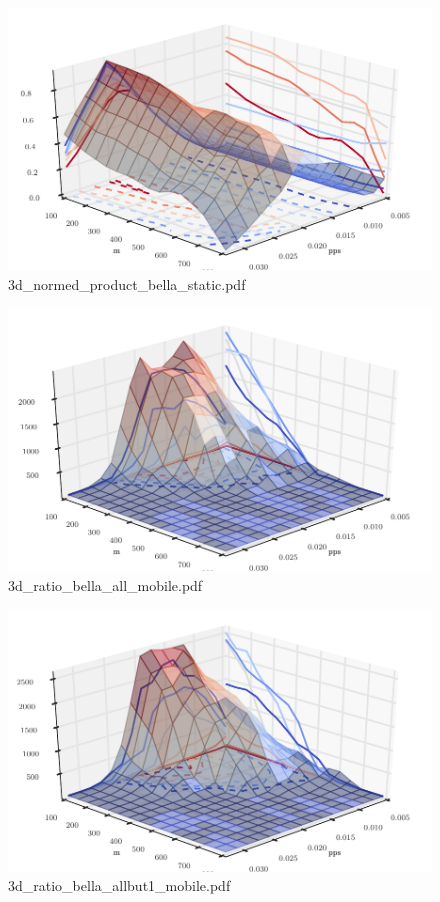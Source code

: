 \documentclass{article}
\begin{document}
\begin{figure}[h!]
\centering
\includegraphics[width=\linewidth]{3d_normed_product_bella_static.pdf}
\caption{3d\_normed\_product\_bella\_static.pdf}
\end{figure}




\begin{figure}[h!]
\centering
\includegraphics[width=\linewidth]{3d_ratio_bella_all_mobile.pdf}
\caption{3d\_ratio\_bella\_all\_mobile.pdf}
\end{figure}




\begin{figure}[h!]
\centering
\includegraphics[width=\linewidth]{3d_ratio_bella_allbut1_mobile.pdf}
\caption{3d\_ratio\_bella\_allbut1\_mobile.pdf}
\end{figure}
\end{document}
